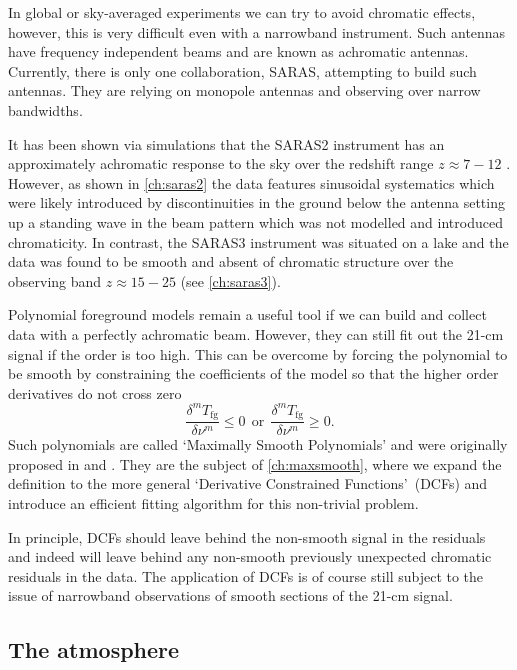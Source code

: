 In global or sky-averaged experiments we can try to avoid chromatic effects, however, this is very difficult even with a narrowband instrument. Such antennas have frequency independent beams and are known as achromatic antennas. Currently, there is only one collaboration, SARAS, attempting to build such antennas. They are relying on monopole antennas and observing over narrow bandwidths. 

It has been shown via simulations that the SARAS2 instrument has an approximately achromatic response to the sky over the redshift range $z\approx7-12$ \cite{Sathyanarayana_msf_2017}. However, as shown in \cref{ch:saras2} the data features sinusoidal systematics which were likely introduced by discontinuities in the ground below the antenna setting up a standing wave in the beam pattern which was not modelled and introduced chromaticity. In contrast, the SARAS3 instrument was situated on a lake and the data was found to be smooth and absent of chromatic structure over the observing band $z\approx15-25$ (see \cref{ch:saras3}). 

Polynomial foreground models remain a useful tool if we can build and collect data with a perfectly achromatic beam. However, they can still fit out the 21-cm signal if the order is too high. This can be overcome by forcing the polynomial to be smooth by constraining the coefficients of the model so that the higher order derivatives do not cross zero
\begin{equation}
    \frac{\delta^m T_\mathrm{fg}}{\delta \nu^m} \leq 0~~\mathrm{or}~~ \frac{\delta^m T_\mathrm{fg}}{\delta \nu^m} \geq 0.
\end{equation}
Such polynomials are called `Maximally Smooth Polynomials' and were originally proposed in \cite{Sathyanarayana_msf_2017} and \cite{Sathyanarayana2015}. They are the subject of \cref{ch:maxsmooth}, where we expand the definition to the more general `Derivative Constrained Functions'~(DCFs) and introduce an efficient fitting algorithm for this non-trivial problem.

In principle, DCFs should leave behind the non-smooth signal in the residuals and indeed will leave behind any non-smooth previously unexpected chromatic residuals in the data. The application of DCFs is of course still subject to the issue of narrowband observations of smooth sections of the 21-cm signal.

\subsection{The atmosphere}

